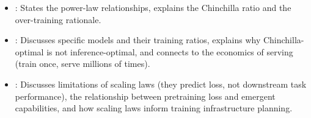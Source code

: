 \begin{interviewq}
\goodgreat
\begin{itemize}
\item {}: States the power-law relationships, explains the
  Chinchilla ratio and the over-training rationale.
\item {}: Discusses specific models and their training ratios,
  explains why Chinchilla-optimal is not inference-optimal, and connects
  to the economics of serving (train once, serve millions of times).
\item {}: Discusses limitations of scaling laws (they predict
  loss, not downstream task performance), the relationship between
  pretraining loss and emergent capabilities, and how scaling laws inform
  training infrastructure planning.
\end{itemize}

\end{interviewq}

